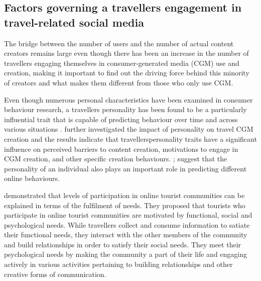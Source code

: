 		


\subsection{Factors governing a traveller\textquotesingle s engagement in travel-related social media}

 The bridge between the number of users and the number of actual content creators remains large even though there has been an increase in the number of travellers engaging themselves in consumer-generated media (CGM) use and creation, making it important to find out the driving force behind this minority of creators and what makes them different from those who only use CGM. \cite{yoo2011influence}

Even though numerous personal characteristics have been examined in consumer behaviour research, a traveller\textquotesingle s personality has been found to be a particularly influential trait that is capable of predicting behaviour over time and across various situations \cite{woszczynski2002exploring}.  \cite{yoo2011influence} further investigated the impact of personality on travel CGM creation and the results indicate that travellers\textquotesingle personality traits have a significant influence on perceived barriers to content creation, motivations to engage in CGM creation, and other specific creation behaviours. \cite{acar2007online}; \cite{tuten2001understanding} suggest that the personality of an individual also plays an important role in predicting different online behaviours.

 
\cite{wang2002defining} demonstrated that levels of participation in online tourist communities can be explained in terms of the fulfilment of needs. They proposed that tourists who participate in online tourist communities are motivated by functional, social and psychological needs. While travellers collect and consume information to satiate their functional needs, they interact with the other members of the community and build relationships in order to satisfy their social needs. They meet their psychological needs by making the community a part of their life and engaging actively in various activities pertaining to building relationships and other creative forms of communication.

